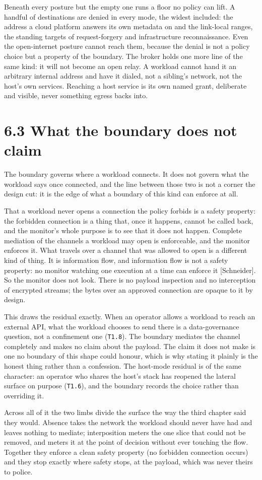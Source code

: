 Beneath every posture but the empty one runs a floor no policy can lift.
A handful of destinations are denied in every mode, the widest included:
the address a cloud platform answers its own metadata on and the
link-local ranges, the standing targets of request-forgery and
infrastructure reconnaissance. Even the open-internet posture cannot
reach them, because the denial is not a policy choice but a property of
the boundary. The broker holds one more line of the same kind: it will
not become an open relay. A workload cannot hand it an arbitrary
internal address and have it dialed, not a sibling's network, not the
host's own services. Reaching a host service is its own named grant,
deliberate and visible, never something egress backs into.

\hypertarget{what-the-boundary-does-not-claim}{%
\section{6.3 What the boundary does not
claim}\label{what-the-boundary-does-not-claim}}

The boundary governs where a workload connects. It does not govern what
the workload says once connected, and the line between those two is not
a corner the design cut: it is the edge of what a boundary of this kind
can enforce at all.

That a workload never opens a connection the policy forbids is a safety
property: the forbidden connection is a thing that, once it happens,
cannot be called back, and the monitor's whole purpose is to see that it
does not happen. Complete mediation of the channels a workload may open
is enforceable, and the monitor enforces it. What travels over a channel
that was allowed to open is a different kind of thing. It is information
flow, and information flow is not a safety property: no monitor watching
one execution at a time can enforce it {[}Schneider{]}. So the monitor
does not look. There is no payload inspection and no interception of
encrypted streams; the bytes over an approved connection are opaque to
it by design.

This draws the residual exactly. When an operator allows a workload to
reach an external API, what the workload chooses to send there is a
data-governance question, not a confinement one (\texttt{T1.8}). The
boundary mediates the channel completely and makes no claim about the
payload. The claim it does not make is one no boundary of this shape
could honour, which is why stating it plainly is the honest thing rather
than a confession. The host-mode residual is of the same character: an
operator who shares the host's stack has reopened the lateral surface on
purpose (\texttt{T1.6}), and the boundary records the choice rather than
overriding it.

Across all of it the two limbs divide the surface the way the third
chapter said they would. Absence takes the network the workload should
never have had and leaves nothing to mediate; interposition meters the
one slice that could not be removed, and meters it at the point of
decision without ever touching the flow. Together they enforce a clean
safety property (no forbidden connection occurs) and they stop exactly
where safety stops, at the payload, which was never theirs to police.

